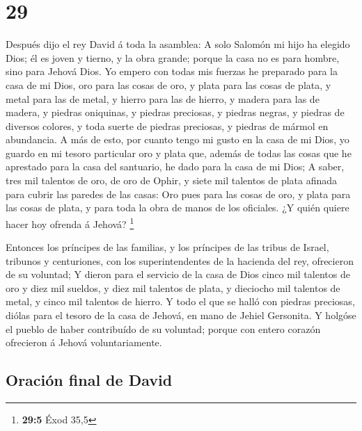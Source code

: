 \hypertarget{section-28}{%
\section{29}\label{section-28}}

 Después dijo el rey David á toda la asamblea: A solo
Salomón mi hijo ha elegido Dios; él es joven y tierno, y la obra grande;
porque la casa no es para hombre, sino para Jehová Dios.  Yo
empero con todas mis fuerzas he preparado para la casa de mi Dios, oro
para las cosas de oro, y plata para las cosas de plata, y metal para las
de metal, y hierro para las de hierro, y madera para las de madera, y
piedras oniquinas, y piedras preciosas, y piedras negras, y piedras de
diversos colores, y toda suerte de piedras preciosas, y piedras de
mármol en abundancia.  A más de esto, por cuanto tengo mi
gusto en la casa de mi Dios, yo guardo en mi tesoro particular oro y
plata que, además de todas las cosas que he aprestado para la casa del
santuario, he dado para la casa de mi Dios;  A saber, tres
mil talentos de oro, de oro de Ophir, y siete mil talentos de plata
afinada para cubrir las paredes de las casas:  Oro pues para
las cosas de oro, y plata para las cosas de plata, y para toda la obra
de manos de los oficiales. ¿Y quién quiere hacer hoy ofrenda á Jehová?
\footnote{\textbf{29:5} Éxod 35,5}

 Entonces los príncipes de las familias, y los príncipes de
las tribus de Israel, tribunos y centuriones, con los superintendentes
de la hacienda del rey, ofrecieron de su voluntad;  Y dieron
para el servicio de la casa de Dios cinco mil talentos de oro y diez mil
sueldos, y diez mil talentos de plata, y dieciocho mil talentos de
metal, y cinco mil talentos de hierro.  Y todo el que se
halló con piedras preciosas, diólas para el tesoro de la casa de Jehová,
en mano de Jehiel Gersonita.  Y holgóse el pueblo de haber
contribuído de su voluntad; porque con entero corazón ofrecieron á
Jehová voluntariamente.

\hypertarget{oraciuxf3n-final-de-david}{%
\subsection{Oración final de David}\label{oraciuxf3n-final-de-david}}

